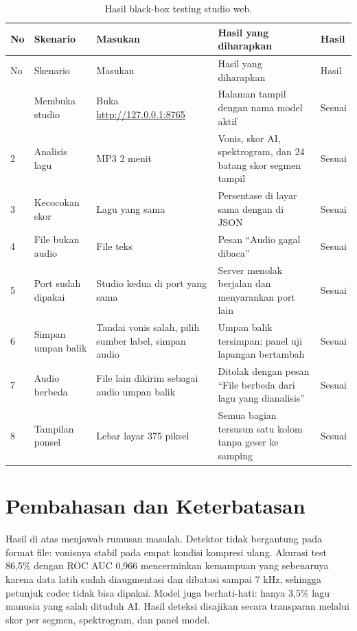 {\singlespacing\small
\begin{longtable}{L{0.5cm} L{2.3cm} L{3.2cm} L{4.4cm} L{1.2cm}}
\caption{Hasil black-box testing studio web.}\label{tab:blackbox}\\
\toprule
No & Skenario & Masukan & Hasil yang diharapkan & Hasil\\
\midrule
\endfirsthead
\toprule
No & Skenario & Masukan & Hasil yang diharapkan & Hasil\\
\midrule
\endhead
\bottomrule
{} & Membuka studio & Buka \url{http://127.0.0.1:8765} & Halaman tampil dengan nama model aktif & Sesuai\\
2 & Analisis lagu & MP3 2 menit & Vonis, skor AI, spektrogram, dan 24 batang skor segmen tampil & Sesuai\\
3 & Kecocokan skor & Lagu yang sama & Persentase di layar sama dengan  di JSON & Sesuai\\
4 & File bukan audio & File teks & Pesan ``Audio gagal dibaca'' & Sesuai\\
5 & Port sudah dipakai & Studio kedua di port yang sama & Server menolak berjalan dan menyarankan port lain & Sesuai\\
6 & Simpan umpan balik & Tandai vonis salah, pilih sumber label, simpan audio & Umpan balik tersimpan; panel uji lapangan bertambah & Sesuai\\
7 & Audio berbeda & File lain dikirim sebagai audio umpan balik & Ditolak dengan pesan ``File berbeda dari lagu yang dianalisis'' & Sesuai\\
8 & Tampilan ponsel & Lebar layar 375 piksel & Semua bagian tersusun satu kolom tanpa geser ke samping & Sesuai\\
\end{longtable}}

\section{Pembahasan dan Keterbatasan}
Hasil di atas menjawab rumusan masalah. Detektor tidak bergantung pada format file: vonisnya stabil pada empat kondisi kompresi ulang. Akurasi test 86,5\% dengan ROC AUC 0,966 mencerminkan kemampuan yang sebenarnya karena data latih sudah diaugmentasi dan dibatasi sampai 7 kHz, sehingga petunjuk codec tidak bisa dipakai. Model juga berhati-hati: hanya 3,5\% lagu manusia yang salah dituduh AI. Hasil deteksi disajikan secara transparan melalui skor per segmen, spektrogram, dan panel model.

